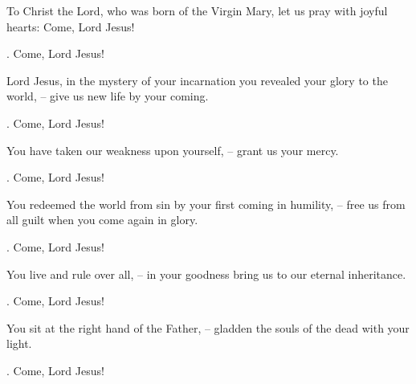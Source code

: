 \lettrine[lines=2]{T}{}o Christ the Lord, who was born of the Virgin Mary, let us pray with joyful hearts: Come, Lord Jesus!
\par \Rbar. Come, Lord Jesus!

Lord Jesus, in the mystery of your incarnation you revealed your glory to the world,
– give us new life by your coming.
\par \Rbar. Come, Lord Jesus!

You have taken our weakness upon yourself,
– grant us your mercy.
\par \Rbar. Come, Lord Jesus!

You redeemed the world from sin by your first coming in humility,
– free us from all guilt when you come again in glory.
\par \Rbar. Come, Lord Jesus!

You live and rule over all,
– in your goodness bring us to our eternal inheritance.
\par \Rbar. Come, Lord Jesus!

You sit at the right hand of the Father,
– gladden the souls of the dead with your light.
\par \Rbar. Come, Lord Jesus!
